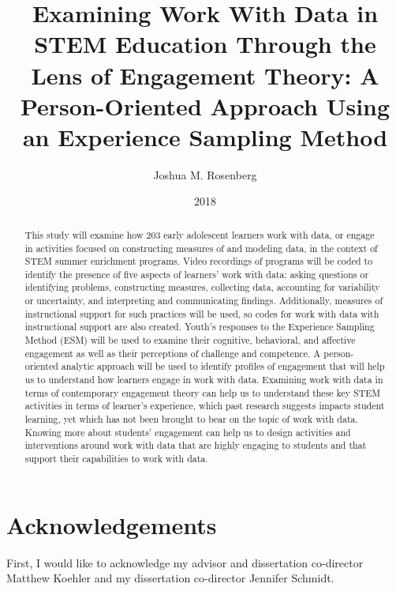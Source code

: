 \documentclass[]{msu-thesis}
\title{Examining Work With Data in STEM Education Through the Lens of Engagement Theory: A Person-Oriented Approach Using an Experience Sampling Method
}
\author{Joshua M. Rosenberg}
\date{2018}
\theoremstyle{definition}
\theoremstyle{definition}
\theoremstyle{definition}
\theoremstyle{remark}
\begin{document}

\maketitlepage
\begin{abstract}
This study will examine how 203 early adolescent learners work with data, or engage in activities focused on constructing measures of and modeling data, in the context of STEM summer enrichment programs. Video recordings of programs will be coded to identify the presence of five aspects of learners’ work with data: asking questions or identifying problems, constructing measures, collecting data, accounting for variability or uncertainty, and interpreting and communicating findings. Additionally, measures of instructional support for such practices will be used, so codes for work with data with instructional support are also created. Youth’s responses to the Experience Sampling Method (ESM) will be used to examine their cognitive, behavioral, and affective engagement as well as their perceptions of challenge and competence. A person-oriented analytic approach will be used to identify profiles of engagement that will help us to understand how learners engage in work with data. Examining work with data in terms of contemporary engagement theory can help us to understand these key STEM activities in terms of learner's experience, which past research suggests impacts student learning, yet which has not been brought to bear on the topic of work with data. Knowing more about students’ engagement can help us to design activities and interventions around work with data that are highly engaging to students and that support their capabilities to work with data.

\end{abstract}

\clearpage

\makecopyrightpage

%
\makededicationpage
%
\clearpage

\chapter*{Acknowledgements}
\DoubleSpacing %
First, I would like to acknowledge my advisor and dissertation co-director Matthew Koehler and my dissertation co-director Jennifer Schmidt.
\clearpage
\end{document}
